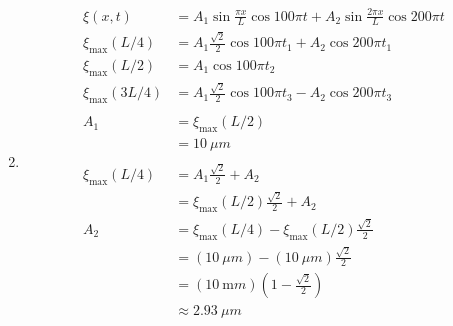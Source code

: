 \documentclass{article}
\begin{document}
\begin{enumerate}
  \setcounter{enumi}{1}
  \item

        \begin{align*}
          \xi(x, t)               & = A_1 \sin \frac{\pi x}{L} \cos 100 \pi t + A_2 \sin \frac{2 \pi x}{L} \cos 200 \pi t \\
          \xi_\text{max}(L / 4)   & = A_1 \frac{\sqrt{2}}{2} \cos 100 \pi t_1 + A_2 \cos 200 \pi t_1                      \\
          \xi_\text{max}(L / 2)   & = A_1 \cos 100 \pi t_2                                                                \\
          \xi_\text{max}(3 L / 4) & = A_1 \frac{\sqrt{2}}{2} \cos 100 \pi t_3 - A_2 \cos 200 \pi t_3                      \\ \\
          A_1                     & = \xi_\text{max}(L / 2)                                                               \\
                                  & = \qty{10}{\mu m}                                                                     \\ \\
          \xi_\text{max}(L / 4)   & = A_1 \frac{\sqrt{2}}{2} + A_2                                                        \\
                                  & = \xi_\text{max}(L / 2) \frac{\sqrt{2}}{2} + A_2                                      \\
          A_2                     & = \xi_\text{max}(L / 4) - \xi_\text{max}(L / 2) \frac{\sqrt{2}}{2}                    \\
                                  & = (\qty{10}{\mu m}) - (\qty{10}{\mu m}) \frac{\sqrt{2}}{2}                            \\
                                  & = (\qty{10}{\m m}) \left( 1 - \frac{\sqrt{2}}{2} \right)                              \\
                                  & \approx \qty{2.93}{\mu m}
        \end{align*}
\end{enumerate}

\subsection{}
\end{document}

